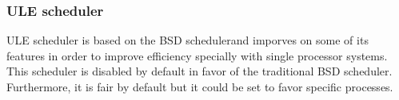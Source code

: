 \documentclass[journal,10pt,onecolumn,compsoc,letterpaper,draftclsnofoot,table,xcdraw]{IEEEtran} \usepackage[margin=0.75in]{geometry}
\begin{document}
\subsubsection{ULE scheduler}
\noindent ULE scheduler is based on the BSD schedulerand imporves on some of its features in order to improve efficiency specially with single processor systems. This scheduler is disabled by default in favor of the traditional BSD scheduler. Furthermore, it is fair by default but it could be set to favor specific processes.
\newpage


\end{document}
